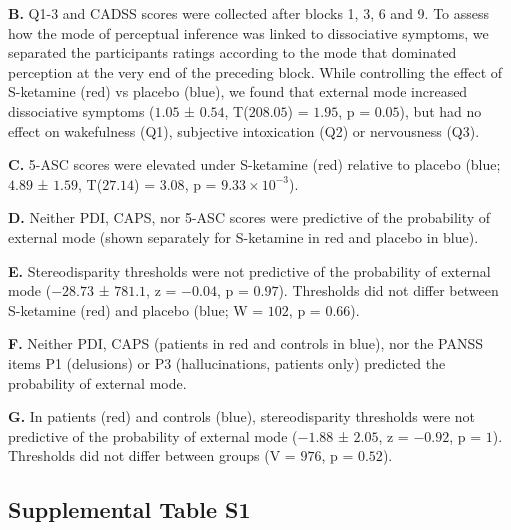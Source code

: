 \documentclass[
]{article}
\begin{document}
\textbf{B.} Q1-3 and CADSS scores were collected after blocks 1, 3, 6
and 9. To assess how the mode of perceptual inference was linked to
dissociative symptoms, we separated the participants ratings according
to the mode that dominated perception at the very end of the preceding
block. While controlling the effect of S-ketamine (red) vs placebo
(blue), we found that external mode increased dissociative symptoms
(\(1.05\) ± \(0.54\), T(\(208.05\)) = \(1.95\), p = \(0.05\)), but had
no effect on wakefulness (Q1), subjective intoxication (Q2) or
nervousness (Q3).

\textbf{C.} 5-ASC scores were elevated under S-ketamine (red) relative
to placebo (blue; \(4.89\) ± \(1.59\), T(\(27.14\)) = \(3.08\), p =
\(\ensuremath{9.33\times 10^{-3}}\)).

\textbf{D.} Neither PDI, CAPS, nor 5-ASC scores were predictive of the
probability of external mode (shown separately for S-ketamine in red and
placebo in blue).

\textbf{E.} Stereodisparity thresholds were not predictive of the
probability of external mode (\(-28.73\) ± \(781.1\), z = \(-0.04\), p =
\(0.97\)). Thresholds did not differ between S-ketamine (red) and
placebo (blue; W = \(102\), p = \(0.66\)).

\textbf{F.} Neither PDI, CAPS (patients in red and controls in blue),
nor the PANSS items P1 (delusions) or P3 (hallucinations, patients only)
predicted the probability of external mode.

\textbf{G.} In patients (red) and controls (blue), stereodisparity
thresholds were not predictive of the probability of external mode
(\(-1.88\) ± \(2.05\), z = \(-0.92\), p = \(1\)). Thresholds did not
differ between groups (V = \(976\), p = \(0.52\)).

\newpage

\hypertarget{supplemental-table-s1}{%
\subsection{Supplemental Table S1}\label{supplemental-table-s1}}
\end{document}
